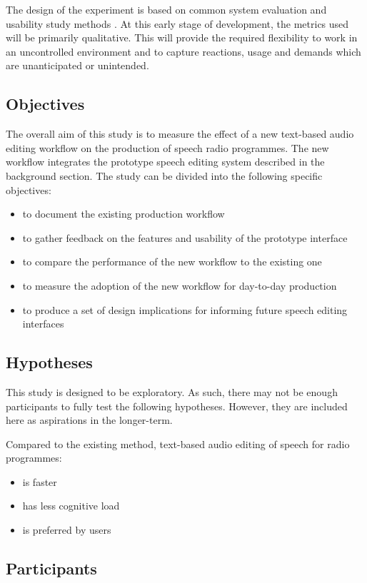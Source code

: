 The design of the experiment is based on common system evaluation and usability
study methods \cite{Lindgaard1994}. At this early stage of development, the
metrics used will be primarily qualitative. This will provide the required
flexibility to work in an uncontrolled environment and to capture reactions,
usage and demands which are unanticipated or unintended.

\subsection{Objectives}
The overall aim of this study is to measure the effect of a new text-based
audio editing workflow on the production of speech radio programmes. The new
workflow integrates the prototype speech editing system described in the
background section. The study can be divided into the following specific
objectives:

\begin{itemize}
  \item to document the existing production workflow
  \item to gather feedback on the features and usability of the prototype interface
  \item to compare the performance of the new workflow to the existing one
  \item to measure the adoption of the new workflow for day-to-day production
  \item to produce a set of design implications for informing future speech editing interfaces
\end{itemize}

\subsection{Hypotheses}
This study is designed to be exploratory. As such, there may not be enough
participants to fully test the following hypotheses. However, they are included
here as aspirations in the longer-term.

Compared to the existing method, text-based audio editing of speech for radio
programmes:
\begin{itemize}
\item is faster
\item has less cognitive load
\item is preferred by users
\end{itemize}

\subsection{Participants}
